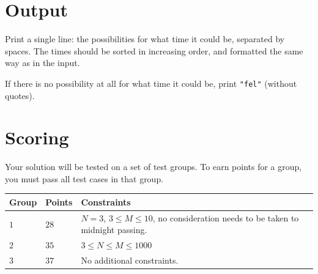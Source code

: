 \section*{Output}
Print a single line: the possibilities for what time it could be, separated by spaces.
The times should be sorted in increasing order, and formatted the same way as in the input.

If there is no possibility at all for what time it could be, print \texttt{"fel"} (without quotes).

\section*{Scoring}
Your solution will be tested on a set of test groups. To earn points for a group, you must pass all test cases in that group.\\

\noindent
\begin{tabular}{| l | l | p{12cm} |}
  \hline
  Group & Points & Constraints \\ \hline
    $1$   & $28$     & $N = 3$, $3 \le M \le 10$, no consideration needs to be taken to midnight passing. \\ \hline
    $2$   & $35$     & $3 \le N \le M \le 1000$ \\ \hline
    $3$   & $37$     & No additional constraints. \\ \hline
\end{tabular}
